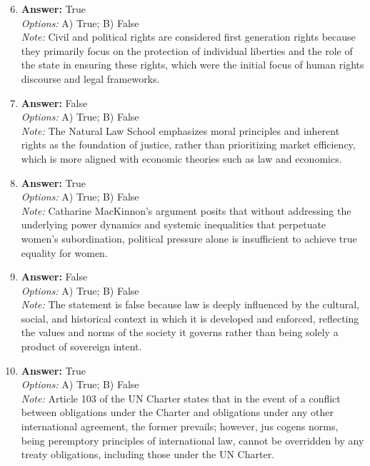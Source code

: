 \documentclass[12pt]{article}
\begin{document}
\begin{enumerate}[label=\arabic*.]
\setcounter{enumi}{5}
\item \textbf{Answer:} True
\\ \textit{Options:} A) True; B) False
\\ \textit{Note:} Civil and political rights are considered first generation rights because they primarily focus on the protection of individual liberties and the role of the state in ensuring these rights, which were the initial focus of human rights discourse and legal frameworks.
\item \textbf{Answer:} False
\\ \textit{Options:} A) True; B) False
\\ \textit{Note:} The Natural Law School emphasizes moral principles and inherent rights as the foundation of justice, rather than prioritizing market efficiency, which is more aligned with economic theories such as law and economics.
\item \textbf{Answer:} True
\\ \textit{Options:} A) True; B) False
\\ \textit{Note:} Catharine MacKinnon's argument posits that without addressing the underlying power dynamics and systemic inequalities that perpetuate women's subordination, political pressure alone is insufficient to achieve true equality for women.
\item \textbf{Answer:} False
\\ \textit{Options:} A) True; B) False
\\ \textit{Note:} The statement is false because law is deeply influenced by the cultural, social, and historical context in which it is developed and enforced, reflecting the values and norms of the society it governs rather than being solely a product of sovereign intent.
\item \textbf{Answer:} True
\\ \textit{Options:} A) True; B) False
\\ \textit{Note:} Article 103 of the UN Charter states that in the event of a conflict between obligations under the Charter and obligations under any other international agreement, the former prevails; however, jus cogens norms, being peremptory principles of international law, cannot be overridden by any treaty obligations, including those under the UN Charter.
\end{enumerate}
\end{document}
